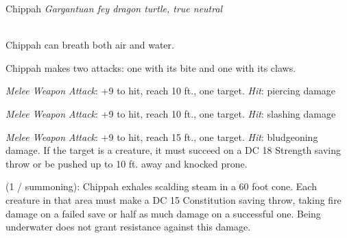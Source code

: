 \documentclass[letterpaper,10pt,twoside,twocolumn,openany]{book}
\begin{document}
\begin{monsterbox}{ Chippah}
	\textit{Gargantuan fey dragon turtle, true neutral}\\
	\hline%
	\basics[%
	armorclass = 17 (natural armor),
	hitpoints  = \dice{8d20 + 35},
	speed      = {20 ft., swim 40 ft.}
	]
	\hline%
	\stats[
    STR = \stat{20}, %
    DEX = \stat{8},
    CON = \stat{20},
    INT = \stat{7},
    WIS = \stat{12},
    CHA = \stat{8}
	]
	\hline%
	\details[%
	skills = {Athletics + 10},
	senses = {darkvision 120 ft., pp 11},
	languages = {Dragon Turtle, understands Common, Draconic, and Sylvan but cannot speak},
	challenge = 4
	]
	\hline \\[1mm]
	\begin{monsteraction}[Amphibious]
		Chippah can breath both air and water.
	\end{monsteraction}
	
	\begin{monsteraction}[Multiattack]
		Chippah makes two attacks: one with its bite and one with its claws.
	\end{monsteraction}
	
	\begin{monsteraction}[Bite]
		\emph{Melee Weapon Attack}: +9 to hit, reach 10 ft., one target. \emph{Hit}:  piercing damage
	\end{monsteraction}

	\begin{monsteraction}[Claw]
		\emph{Melee Weapon Attack}: +9 to hit, reach 10 ft., one target. \emph{Hit}:  slashing damage
	\end{monsteraction}

	\begin{monsteraction}[Tail]
		\emph{Melee Weapon Attack}: +9 to hit, reach 15 ft., one target. \emph{Hit}:  bludgeoning damage.
		If the target is a creature, it must succeed on a DC 18 Strength saving throw or be pushed up to 10 ft. away and knocked prone.
	\end{monsteraction}
	
	\begin{monsteraction}
		(1 / summoning): Chippah exhales scalding steam in a 60 foot cone. Each creature in that area must make a DC 15 Constitution saving throw, taking  fire damage on a failed save or half as much damage on a successful one. 
		Being underwater does not grant resistance against this damage.
	\end{monsteraction}
	
\end{monsterbox}
\end{document}
